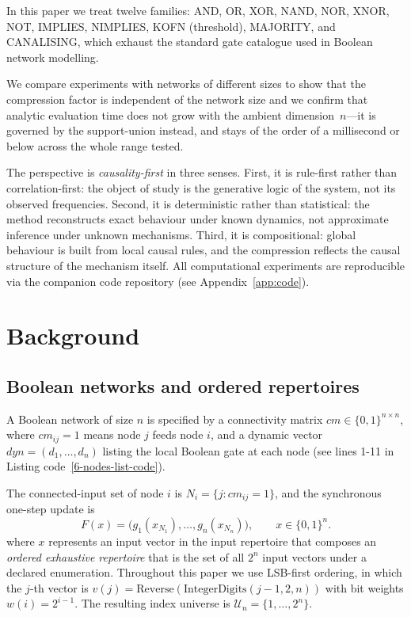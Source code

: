 \documentclass[11pt]{article}
\newcommand{\bits}{\{0,1\}}
\begin{document}
In this paper we treat twelve families: AND, OR, XOR, NAND, NOR, XNOR, NOT, IMPLIES,
NIMPLIES, KOFN (threshold), MAJORITY, and CANALISING, which exhaust the
standard gate catalogue used in Boolean network modelling.

We compare experiments with networks of different sizes to show that 
the compression factor is independent of the network size and we 
confirm that analytic evaluation time does not grow with the ambient
dimension~$n$---it is governed by the support-union instead, and stays of the
order of a millisecond or below across the whole range tested.

The perspective is \emph{causality-first} in three senses.  First, it is
rule-first rather than correlation-first: the object of study is the
generative logic of the system, not its observed frequencies.
Second, it is deterministic rather than statistical: the method
reconstructs exact behaviour under known dynamics, not approximate
inference under unknown mechanisms.  Third, it is compositional: global
behaviour is built from local causal rules, and the compression reflects
the causal structure of the mechanism itself.
All computational experiments are reproducible via the companion code
repository (see Appendix~\ref{app:code}).


\section{Background}\label{sec:background}

\subsection{Boolean networks and ordered repertoires}\label{sec:bn-setup}

A Boolean network of size $n$ is specified by a connectivity matrix
$cm\in\bits^{n\times n}$, where $cm_{ij}=1$ means node $j$ feeds node $i$,
and a dynamic vector $\mathit{dyn}=(d_1,\ldots,d_n)$ listing the local
Boolean gate at each node (see lines 1-11 in Listing code~\ref{6-nodes-list-code}). 

The connected-input set of node $i$ is
$N_i=\{j:cm_{ij}=1\}$, and the synchronous one-step update is
\[
F(x)=\bigl(g_1(x_{N_1}),\ldots,g_n(x_{N_n})\bigr),
\qquad x\in\bits^n.
\]
where $x$ represents an input vector in the input repertoire that composes
an \emph{ordered exhaustive repertoire} that is the set of all $2^n$ input
vectors under a declared enumeration.  
Throughout this paper we use
LSB-first ordering, in which the $j$-th vector is
$v(j)=\mathrm{Reverse}(\mathrm{IntegerDigits}(j{-}1,2,n))$ with bit
weights $w(i)=2^{i-1}$.  The resulting index universe is
$\mathcal{U}_n=\{1,\ldots,2^n\}$.
\end{document}

